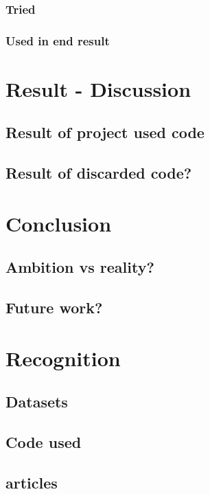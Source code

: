 \documentclass[11pt,a4paper,UKenglish]{article}
\begin{document}
\subsubsection{Tried}
\subsubsection{Used in end result}


\newpage
\section{Result - Discussion}
\label{sec:Result - Discussion}
\subsection{Result of project used code}
\subsection{Result of discarded code?}

\newpage
\section{Conclusion}
\label{sec:Conclusion}
\subsection{Ambition vs reality?}
\subsection{Future work?}

\newpage
\section{Recognition}
\label{sec:Recognition}
\subsection{Datasets}
\subsection{Code used}
\subsection{articles}
\end{document}
